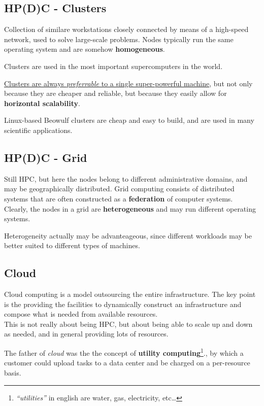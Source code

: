 \subsection{HP(D)C - Clusters}
Collection of similare workstations closely connected by means of a high-speed network, used to solve large-scale problems.
Nodes typically run the same operating system and are somehow \textbf{homogeneous}.

Clusters are used in the most important supercomputers in the world.

\ul{Clusters are always \textit{preferrable} to a single super-powerful machine}, but not only because they are cheaper and reliable, but because they easily allow for \textbf{horizontal scalability}.

{Linux-based Beowulf clusters are cheap and easy to build, and are used in many scientific applications.}

\subsection{HP(D)C - Grid}
Still HPC, but here the nodes belong to different administrative domains, and may be geographically distributed.
Grid computing consists of distributed systems that are often constructed as a \textbf{federation} of computer systems.\\
Clearly, the nodes in a grid are \textbf{heterogeneous} and may run different operating systems.

Heterogeneity actually may be advanteageous, since different workloads may be better suited to different types of machines.



\subsection{Cloud}

Cloud computing is a model outsourcing the entire infrastructure.
The key point is the providing the facilities to dynamically construct an infrastructure and compose what is needed from available resources.\\
This is not really about being HPC, but about being able to scale up and down as needed, and in general providing lots of resources.

The father of \textit{cloud} was the the concept of \textbf{utility computing}\footnote{\textit{``utilities''} in english are water, gas, electricity, etc\dots}., by which a customer could upload tasks to a data center and be charged on
a per-resource basis.

